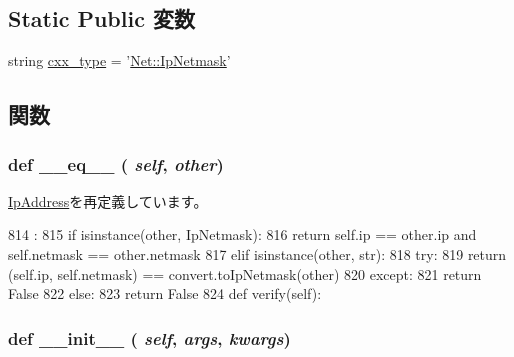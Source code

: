 \subsection*{Static Public 変数}
\begin{DoxyCompactItemize}
\item 
string \hyperlink{classm5_1_1params_1_1IpNetmask_a2f1553ebb79374a68b36fdd6d8d82fc3}{cxx\_\-type} = '\hyperlink{structNet_1_1IpNetmask}{Net::IpNetmask}'
\end{DoxyCompactItemize}


\subsection{関数}
\hypertarget{classm5_1_1params_1_1IpNetmask_a449f8fd74d358c0ad641b6c6d6917ba0}{
\subsubsection[{\_\-\_\-eq\_\-\_\-}]{\setlength{\rightskip}{0pt plus 5cm}def \_\-\_\-eq\_\-\_\- ( {\em self}, \/   {\em other})}}
\label{classm5_1_1params_1_1IpNetmask_a449f8fd74d358c0ad641b6c6d6917ba0}


\hyperlink{classm5_1_1params_1_1IpAddress_a449f8fd74d358c0ad641b6c6d6917ba0}{IpAddress}を再定義しています。


\begin{DoxyCode}
814                            :
815         if isinstance(other, IpNetmask):
816             return self.ip == other.ip and self.netmask == other.netmask
817         elif isinstance(other, str):
818             try:
819                 return (self.ip, self.netmask) == convert.toIpNetmask(other)
820             except:
821                 return False
822         else:
823             return False
824 
    def verify(self):
\end{DoxyCode}
\hypertarget{classm5_1_1params_1_1IpNetmask_ac775ee34451fdfa742b318538164070e}{
\subsubsection[{\_\-\_\-init\_\-\_\-}]{\setlength{\rightskip}{0pt plus 5cm}def \_\-\_\-init\_\-\_\- ( {\em self}, \/   {\em args}, \/   {\em kwargs})}}
\label{classm5_1_1params_1_1IpNetmask_ac775ee34451fdfa742b318538164070e}



